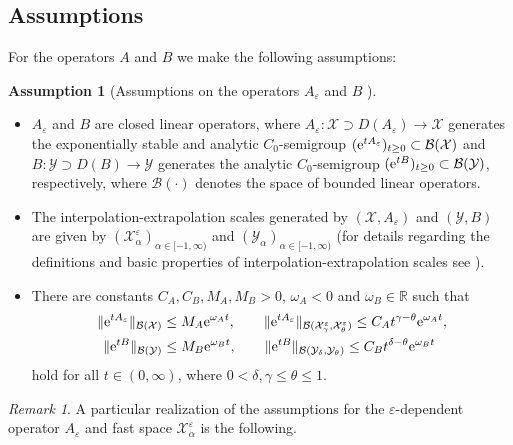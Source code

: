 \documentclass[11pt]{article}
\theoremstyle{definition}
\newtheorem{assumption}[theorem]{Assumption}
\theoremstyle{remark}
\newtheorem{remark}[theorem]{Remark}
\numberwithin{equation}{section}
\newcommand{\eps}{\varepsilon}
\newcommand{\mc}[1]{\mathcal{#1}}
\begin{document}
\subsection{Assumptions}\label{Sec:assumptions}
For the operators $A$ and $B$ we make the following assumptions:
\begin{assumption}[Assumptions on the operators $A_\eps$ and $B$ ]\label{ass: operators}
\leavevmode
\begin{itemize}
    \item $A_\eps$ and $B$ are closed linear operators, where $A_\varepsilon : \mc X \supset D(A_\varepsilon) \to \mc X$ generates the exponentially stable and analytic $C_0$-semigroup $(\textnormal{e}^{tA_\eps})_{t\geq 0}\subset \mathcal{B}(\mc X)$ and $B:\mc Y\supset D(B)\to \mc Y$ generates the analytic $C_0$-semigroup $(\textnormal{e}^{tB})_{t\geq 0}\subset \mathcal{B}(\mc Y)$, respectively, where $\mathcal{B}(\cdot)$ denotes the space of bounded linear operators.
    \item The interpolation-extrapolation scales generated by $(\mc X,A_\eps)$ and $(\mc Y,B)$ are given by $(\mc X_\alpha^\eps)_{\alpha\in [-1,\infty)}$ and $(\mc Y_\alpha)_{\alpha\in [-1,\infty)}$ (for details regarding the definitions and basic properties of interpolation-extrapolation scales see \cite{amann1995linear}).
     \item There are constants $C_A,C_B, M_A, M_B>0$, $\omega_A <0 $ and $\omega_B\in \mathbb{R}$ such that
    \begin{align}\label{eq: semigroup estimate}
    \begin{split}
        \|\textnormal{e}^{tA_\eps}\|_{\mathcal{B}(\mc X)}&\leq M_A \textnormal{e}^{\omega_A t},\qquad \|\textnormal{e}^{tA_\eps}\|_{\mathcal{B}(\mc X_\gamma^\eps,\mc X_{\theta}^\eps)}\leq C_At^{\gamma-\theta}\textnormal{e}^{\omega_A t},\\
        \|\textnormal{e}^{tB}\|_{\mathcal{B}(\mc Y)}&\leq M_B \textnormal{e}^{\omega_B t},\qquad \|\textnormal{e}^{tB}\|_{\mathcal{B}(\mc Y_\delta,\mc Y_{\theta})}\leq C_B t^{\delta-\theta} \textnormal{e}^{\omega_B t}
        \end{split}
    \end{align}
    hold for all $t\in (0,\infty)$, where $0<\delta,\gamma\leq \theta\leq 1$.
\end{itemize}
\begin{remark}
    A particular realization of the assumptions for the $\eps$-dependent operator $A_\eps$ and fast space $\mc X_\alpha^\eps$ is the following.\\

\end{remark}
\end{assumption}
\end{document}
